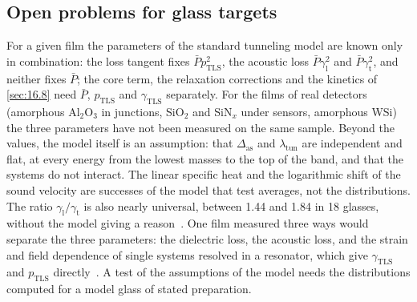 \subsection{Open problems for glass targets}\label{sec:16.7-open}

For a given film the parameters of the standard tunneling model are known only in combination: the loss tangent fixes $\bar Pp_{\mathrm{TLS}}^2$, the acoustic loss $\bar P\gamma_{\mathrm{l}}^2$ and $\bar P\gamma_{\mathrm{t}}^2$, and neither fixes $\bar P$; the core term, the relaxation corrections and the kinetics of \cref{sec:16.8} need $\bar P$, $p_{\mathrm{TLS}}$ and $\gamma_{\mathrm{TLS}}$ separately. For the films of real detectors (amorphous Al$_2$O$_3$ in junctions, SiO$_2$ and SiN$_x$ under sensors, amorphous WSi) the three parameters have not been measured on the same sample. Beyond the values, the model itself is an assumption: that $\Delta_{\mathrm{as}}$ and $\lambda_{\mathrm{tun}}$ are independent and flat, at every energy from the lowest masses to the top of the band, and that the systems do not interact. The linear specific heat and the logarithmic shift of the sound velocity are successes of the model that test averages, not the distributions. The ratio $\gamma_{\mathrm{l}}/\gamma_{\mathrm{t}}$ is also nearly universal, between 1.44 and 1.84 in 18 glasses, without the model giving a reason~\cite{zhou2015generic}. One film measured three ways would separate the three parameters: the dielectric loss, the acoustic loss, and the strain and field dependence of single systems resolved in a resonator, which give $\gamma_{\mathrm{TLS}}$ and $p_{\mathrm{TLS}}$ directly~\cite{muller2019towards}. A test of the assumptions of the model needs the distributions computed for a model glass of stated preparation.
